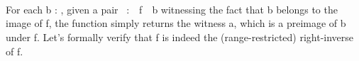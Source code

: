 \begin{code}%
\>[0]\<%
\\
\>[0][@{}l@{\AgdaIndent{1}}]%
\>[1]\AgdaSpace{}%
\AgdaSymbol{:}\AgdaSpace{}%
\AgdaSymbol{(}\AgdaSpace{}%
\AgdaSymbol{:}\AgdaSpace{}%
\AgdaSpace{}%
\AgdaSpace{}%
\AgdaSymbol{)\{}\AgdaSpace{}%
\AgdaSymbol{:}\AgdaSpace{}%
\AgdaSymbol{\}}\AgdaSpace{}%
\AgdaSpace{}%
\AgdaSpace{}%
\AgdaSpace{}%
\AgdaSpace{}%
\AgdaSpace{}%
\AgdaSpace{}%
\AgdaSpace{}%
\<%
\\
%
\>[1]\AgdaSpace{}%
\AgdaSymbol{\AgdaUnderscore{}}\AgdaSpace{}%
\AgdaSymbol{(}\AgdaSpace{}%
\AgdaSpace{}%
\AgdaSymbol{\AgdaUnderscore{})}\AgdaSpace{}%
\AgdaSymbol{=}\AgdaSpace{}%
\<%
\\
\>[0]\<%
\end{code}
For each \ab b : , given a pair ~\as :~~\ab f~~\ab b witnessing the fact that \ab b belongs to the image of \ab f, the function  simply returns the witness \ab a, which is a preimage of \ab b under \ab f.
Let's formally verify that  \ab f is indeed the (range-restricted) right-inverse of \ab f.


\begin{code}%
\>[0]\<%
\\
\>[0][@{}l@{\AgdaIndent{1}}]%
\>[1]\AgdaSpace{}%
\AgdaSymbol{:}\AgdaSpace{}%
\AgdaSymbol{\{}\AgdaSpace{}%
\AgdaSymbol{:}\AgdaSpace{}%
\AgdaSpace{}%
\AgdaSpace{}%
\AgdaSymbol{\}\{}\AgdaSpace{}%
\AgdaSymbol{:}\AgdaSpace{}%
\AgdaSymbol{\}(}\AgdaSpace{}%
\AgdaSymbol{:}\AgdaSpace{}%
\AgdaSpace{}%
\AgdaSpace{}%
\AgdaSpace{}%
\AgdaSymbol{)}\AgdaSpace{}%
\AgdaSpace{}%
\AgdaSpace{}%
\AgdaSpace{}%
\AgdaSymbol{(}\AgdaSpace{}%
\AgdaSpace{}%
\AgdaSymbol{)}\AgdaSpace{}%
\AgdaSpace{}%
\<%
\\
%
\>[1]\AgdaSpace{}%
\AgdaSymbol{(}\AgdaSpace{}%
\AgdaSymbol{\AgdaUnderscore{}}\AgdaSpace{}%
\AgdaSymbol{)}\AgdaSpace{}%
\AgdaSymbol{=}\AgdaSpace{}%
\AgdaSpace{}%
\<%
\end{code}


